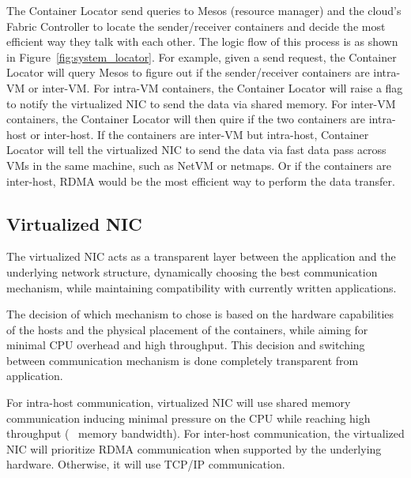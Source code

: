 The Container Locator send queries to Mesos (resource manager) and the cloud's Fabric Controller to locate
the sender/receiver containers and decide the most efficient way they talk with each other.
The logic flow of this process is as shown in Figure~\ref{fig:system_locator}.
For example, given a send request, the Container Locator will query Mesos to figure out if the 
sender/receiver containers are intra-VM or inter-VM. 
For intra-VM containers, the Container Locator will raise a flag to notify the virtualized NIC to
send the data via shared memory.
For inter-VM containers, the Container Locator will then quire if the two containers are intra-host
or inter-host.
If the containers are inter-VM but intra-host, Container Locator will tell the virtualized NIC to send
the data via fast data pass across VMs in the same machine, such as NetVM\cite{} or netmaps\cite{}.
Or if the containers are inter-host, RDMA would be the most efficient way to perform the data transfer.



\subsection{Virtualized NIC}
The virtualized NIC acts as a transparent layer between the application and the underlying network structure, dynamically choosing the best communication mechanism, while maintaining compatibility with currently written applications.

The decision of which mechanism to chose is based on the hardware capabilities of the hosts and the physical placement of the containers, while aiming for minimal CPU overhead and high throughput. This decision and switching between communication mechanism is done completely transparent from application.

For intra-host communication, virtualized NIC will use shared memory communication inducing minimal pressure on the CPU while reaching high throughput (~ memory bandwidth). For inter-host communication, the virtualized NIC will prioritize RDMA communication when supported by the underlying hardware. Otherwise, it will use TCP/IP communication. 


